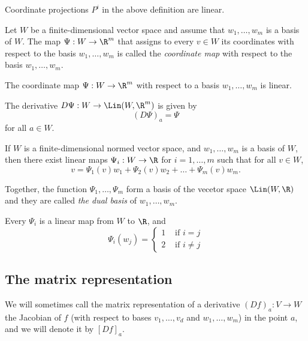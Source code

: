 \begin{proposition}
    Coordinate projections $P^i$ in the above definition are linear.
\end{proposition}

\begin{definition}
    Let $W$ be a finite-dimensional vector space and assume that 
    $w_1,\dots,w_m$ is a basis of $W$. The map $\Psi:W \to \R^m$
    that assigns to every $v \in W$ its coordinates with respect
    to the basis $w_1,\dots,w_m$ is called the \emph{coordinate map}
    with respect to the basis $w_1,\dots,w_m$.
\end{definition}

\begin{proposition}
    The coordinate map $\Psi: W \to \R^m$ with respect to a basis $w_1,\dots,w_m$ is linear.
\end{proposition}

\begin{corollary}
    The derivative $D\Psi:W \to \Lin(W,\R^m)$ is given by
    $$(D\Psi)_a = \Psi$$
    for all $a \in W$.
\end{corollary}

\begin{proposition}
    If $W$ is a finite-dimensional normed vector space, and 
    $w_1,\dots,w_m$ is a basis of $W$, then there exist
    linear maps $\Psi_i:W\to\R$ for $i= 1,\dots,m$ such that
    for all $v \in W$,
    $$v = \Psi_1(v)w_1 + \Psi_2(v)w_2 + \dots + \Psi_m(v)w_m.$$

    Together, the function $\Psi_1,\dots,\Psi_m$ form a basis
    of the vecetor space $\Lin(W,\R)$ and they are called
    \emph{the dual basis} of $w_1,\dots,w_m$.

    Every $\Psi_i$ is a linear map from $W$ to $\R$, and
    $$\Psi_i(w_j) = \begin{cases}1 &\text{ if } i = j \\2 &\text{ if } i \ne j \end{cases}$$
\end{proposition}

\subsection{The matrix representation}
\begin{definition}
    We will sometimes call the matrix representation of a derivative $(Df)_a: V \to W$
    the Jacobian of $f$ (with respect to bases $v_1,\dots,v_d$ and $w_1,\dots,w_m$) in
    the point $a$, and we will denote it by $[Df]_a$.
\end{definition}

